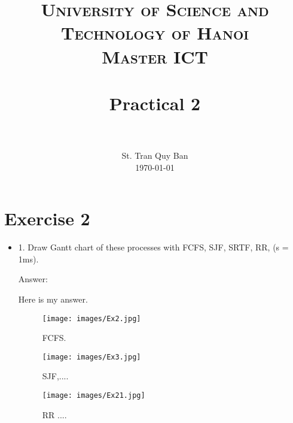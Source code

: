 \documentclass[paper=a4, fontsize=11pt]{scrartcl}
\title{
		\usefont{OT1}{bch}{b}{n}
		\normalfont \normalsize \textsc{University of Science and Technology of Hanoi \\ Master ICT} \\ [25pt]
		\horrule{0.5pt} \\[0.4cm]
		\huge Practical 2 \\
		\horrule{2pt} \\[0.5cm]
}
\author{
		\normalfont 								\normalsize
        St. Tran Quy Ban\\[-3pt]		\normalsize
        \today
}
\date{}
\numberwithin{equation}{section}		%
\numberwithin{figure}{section}			%
\numberwithin{table}{section}				%
\begin{document}
\maketitle

\section{Exercise 2}

\begin{itemize}
	\item 1. Draw Gantt chart of these processes with FCFS, SJF, SRTF, RR, (s = 1ms).
	
	Answer: 
	
	Here is my answer.
	
	\begin{figure}[ht]
	\centering
	\texttt{[image: images/Ex2.jpg]}
	\caption[GANTT]{FCFS.}
	\end{figure}
	

	
	\begin{figure}[ht]
		\centering
		\texttt{[image: images/Ex3.jpg]}
		\caption[GANTT]{SJF,....}
		\end{figure}
		
	\begin{figure}[ht]
	\centering
	\texttt{[image: images/Ex21.jpg]}
	\caption[GANTT]{RR ....}
	\end{figure}	    
   
\end{itemize}



\end{document}
